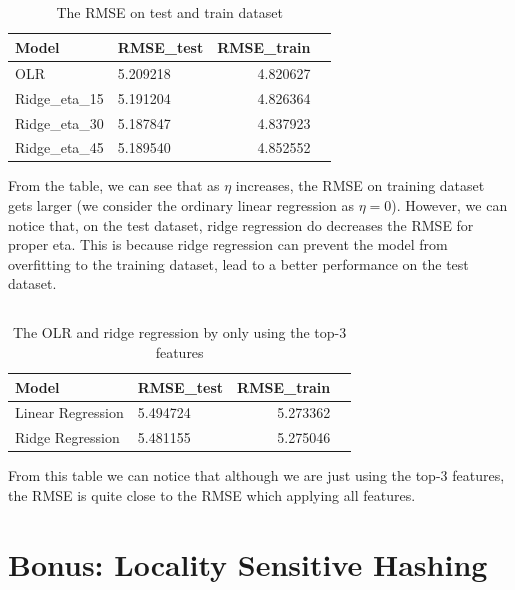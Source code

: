 \documentclass{article}
\begin{document}
\subsection{}
\begin{table}[htbp]
    \begin{center}
\begin{tabular}{llrr}
\toprule
 Model & RMSE\_test & RMSE\_train \\
\midrule
OLR & 5.209218 & 4.820627 \\
Ridge\_eta\_15 & 5.191204 & 4.826364 \\
Ridge\_eta\_30 & 5.187847 & 4.837923 \\
Ridge\_eta\_45 & 5.189540 & 4.852552 \\
\bottomrule
\end{tabular}
    \end{center}
    \caption{The RMSE on test and train dataset}\label{tab:}
\end{table}
From the table, we can see that as $ \eta $ increases, the RMSE on training dataset gets larger (we consider the ordinary linear regression as $ \eta = 0 $). However, we can notice that, on the test dataset, ridge regression do decreases the RMSE for proper eta. This is because ridge regression can prevent the model from overfitting to the training dataset, lead to a better performance on the test dataset.
\subsection{}
\begin{table}[htbp]
    \begin{center}
        \begin{tabular}{llrr}
\toprule
Model & RMSE\_test & RMSE\_train \\
\midrule
 Linear Regression & 5.494724 & 5.273362 \\
 Ridge Regression & 5.481155 & 5.275046 \\
\bottomrule
\end{tabular}
    \caption{The OLR and ridge regression by only using the top-3 features}\label{tab:}
    \end{center}
\end{table}
From this table we can notice that although we are just using the top-3 features, the RMSE is quite close to the RMSE which applying all features.
\clearpage
\section{Bonus: Locality Sensitive Hashing}
\end{document}
